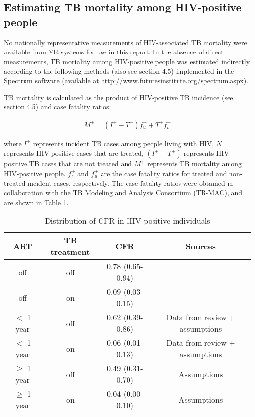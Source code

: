\subsection{Estimating TB mortality among HIV-positive people}

No nationally representative measurements of HIV-associated TB mortality were available from VR systems for use in this report. In the absence of direct measurements, TB mortality among HIV-positive people was estimated indirectly according to the following methods (also see section 4.5) implemented in the Spectrum software (available at http://www.futuresinstitute.org/spectrum.aspx).

TB mortality is calculated as the product of HIV-positive TB incidence (see section 4.5) and case fatality ratios:

\begin{align*}
M^+ = (I^+-T^+)f^+_u + T^+f^+_t
\end{align*}

where $I^+$ represents incident TB cases among people living with HIV, $N$ represents HIV-positive cases that are treated, $(I^+-T^+)$ represents HIV-positive TB cases that are not treated and $M^+$ represents TB mortality among HIV-positive people. $f^+_t$ and $f^+_u$ are the case fatality ratios for treated and non-treated incident cases, respectively. The case fatality ratios were obtained in collaboration with the TB Modeling and Analysis Consortium (TB-MAC), and are shown in Table \ref{tab:hivcfr}.

\begin{table}
    \begin{tabular}{ c c c c }
    \hline
        ART  & TB treatment & CFR & Sources \\ 
        \hline
        off            & off  & 0.78 (0.65-0.94) &  \cite{12742798} \\ 
        off            & on   & 0.09 (0.03-0.15) & \cite{21738585} \cite{11216921}\\ 
        $<$ 1 year     & off  & 0.62 (0.39-0.86) & Data from review + assumptions \\ 
        $<$ 1 year     & on   & 0.06 (0.01-0.13) & Data from review + assumptions \\ 
        $\geq$ 1 year  & off  & 0.49 (0.31-0.70) & Assumptions \\ 
        $\geq$ 1 year  & on   & 0.04 (0.00-0.10) & Assumptions \\ 
        \hline
    \end{tabular} 
    \caption{Distribution of CFR in HIV-positive individuals}
    \label{tab:hivcfr}
\end{table}

